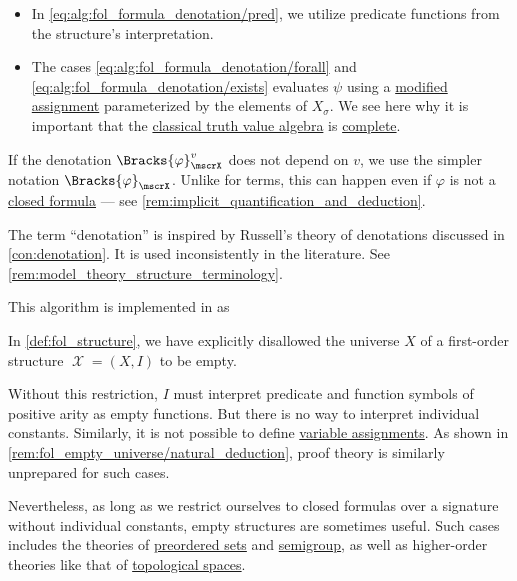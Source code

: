 \begin{algorithm}
\begin{itemize}
    \item In \eqref{eq:alg:fol_formula_denotation/pred}, we utilize predicate functions from the structure's interpretation.

    \item The cases \eqref{eq:alg:fol_formula_denotation/forall} and \eqref{eq:alg:fol_formula_denotation/exists} evaluates \( \psi \) using a \hyperref[def:fol_variable_assignment]{modified assignment} parameterized by the elements of \( X_\sigma \). We see here why it is important that the \hyperref[def:truth_value_algebra/classical]{classical truth value algebra} is \hyperref[def:heyting_algebra/complete]{complete}.
  \end{itemize}

  If the denotation \( \Bracks{\varphi}_\mscrX^v \) does not depend on \( v \), we use the simpler notation \( \Bracks{\varphi}_\mscrX \). Unlike for terms, this can happen even if \( \varphi \) is not a \hyperref[def:fol_closed_formula]{closed formula} --- see \cref{rem:implicit_quantification_and_deduction}.
\end{algorithm}
\begin{comments}
  \item The term \enquote{denotation} is inspired by Russell's theory of denotations discussed in \cref{con:denotation}. It is used inconsistently in the literature. See \cref{rem:model_theory_structure_terminology}.

  \item This algorithm is implemented in \cite{notebook:code} as
  \begin{CodeRefDisplay}
  \end{CodeRefDisplay}
\end{comments}

\begin{remark}\label{rem:fol_empty_universe/semantics}
  In \cref{def:fol_structure}, we have explicitly disallowed the universe \( X \) of a first-order structure \( \mscrX = (X, I) \) to be empty.

  Without this restriction, \( I \) must interpret predicate and function symbols of positive arity as empty functions. But there is no way to interpret individual constants. Similarly, it is not possible to define \hyperref[def:fol_variable_assignment]{variable assignments}. As shown in \cref{rem:fol_empty_universe/natural_deduction}, proof theory is similarly unprepared for such cases.

  Nevertheless, as long as we restrict ourselves to closed formulas over a signature without individual constants, empty structures are sometimes useful. Such cases includes the theories of \hyperref[def:preordered_set]{preordered sets} and \hyperref[def:semigroup]{semigroup}, as well as higher-order theories like that of \hyperref[def:topological_space]{topological spaces}.
\end{remark}

